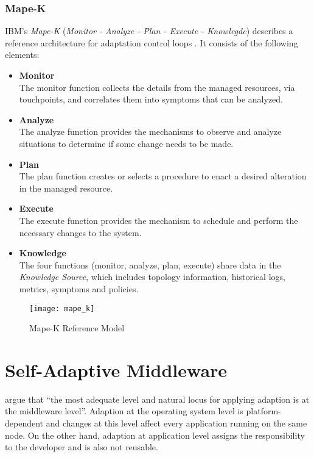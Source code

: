 \subsubsection{Mape-K}
IBM's \emph{Mape-K} (\emph{Monitor - Analyze - Plan - Execute - Knowlegde}) describes a reference architecture for adaptation control loops \citep{Group:2005ug}. It consists of the following elements:
\begin{itemize}
	\item \textbf{Monitor}\\
	The monitor function collects the details from the managed resources, via touchpoints, and correlates them into symptoms that can be analyzed.
	\item \textbf{Analyze}\\
	The analyze function provides the mechanisms to observe and analyze situations to determine if some change needs to be made.
	\item \textbf{Plan}\\
	The plan function creates or selects a procedure to enact a desired alteration in the managed resource.
	\item \textbf{Execute}\\
	The execute function provides the mechanism to schedule and perform the necessary changes to the system.
	\item \textbf{Knowledge}\\
	The four functions (monitor, analyze, plan, execute) share data in the \emph{Knowledge Source}, which includes topology information, historical logs, metrics, symptoms and policies.
\end{itemize}

\begin{figure}[htbp]
	\centering
	\texttt{[image: mape\_k]}
	\caption{Mape-K Reference Model \citep{Group:2005ug}}
	\label{fig:ch03_mape_k}
\end{figure}

\section{Self-Adaptive Middleware}

\citet{Duran-Limon:2004mi} argue that ``the most adequate level and natural locus for applying adaption is at the middleware level''. Adaption at the operating system level is platform-dependent and changes at this level affect every application running on the same node. On the other hand, adaption at application level assigns the responsibility to the developer and is also not reusable.

